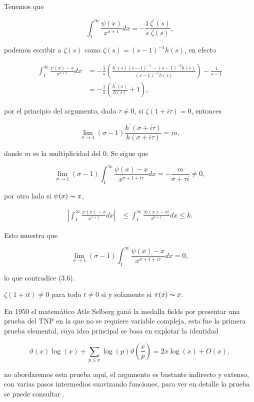 Tenemos que

$$\int_1^{\infty}\frac{\psi(x)}{x^{s+1}}dx=-\frac{1}{s}\frac{\zeta^{\prime}(s)}{\zeta(s)},$$

podemos escribir a $\zeta(s)$ como $\zeta(s)=(s-1)^{-1}h(s)$, en efecto

\begin{align*}
    \int_1^{\infty}\frac{\psi(x)-x}{x^{s+1}}dx&=-\frac{1}{s}\left(\frac{h^{\prime}(s)(s-1)^{-1}-(s-1)^{-2}h(s)}{(s-1)^{-1}h(s)}\right)-\frac{1}{s-1}\\
    &=-\frac{1}{s}\left(\frac{h^{\prime}(s)}{h(s)}+1\right)
,\end{align*}

por el principio del argumento, dado $\tau\neq 0$, si $\zeta(1+i\tau)=0$, entonces

$$\lim_{\sigma \to 1}(\sigma-1)\frac{h^{\prime}(\sigma+i\tau)}{h(\sigma+i\tau)}=m,$$

donde $m$ es la multiplicidad del 0. Se sigue que


\begin{equation}
    \lim_{\sigma \to 1}(\sigma-1)\int_1^{\infty}\frac{\psi(x)-x}{x^{\sigma+1+i\tau}}dx=-\frac{m}{\sigma+\tau i}\neq 0,
\end{equation}

por otro lado si $\psi(x)\thicksim x$, 

\begin{align*}
    \left|\int_1^{\infty}\frac{\psi(x)-x}{x^{s+1}}dx\right|&\leq \int_1^{\infty}\frac{|\psi(x)-x|}{x^{\sigma+1}}dx\leq k
.\end{align*}

Esto muestra que 

$$\lim_{\sigma \to 1} (\sigma-1)\int_1^{\infty}\frac{\psi(x)-x}{x^{\sigma+1+i\tau}}dx=0,$$

lo que contradice (3.6).

\begin{corollary}
    $\zeta(1+it)\neq 0$ para todo $t\neq 0$ si y solamente si $\pi(x)\thicksim x$.
\end{corollary}

En 1950 el matemático Atle Selberg ganó la medalla fields por presentar una prueba del TNP en la que no se requiere variable compleja, esta fue la primera prueba elemental, cuya idea principal se basa en explotar la identidad 

$$\vartheta(x) \log (x)+\sum_{p \leq x} \log (p) \vartheta\left(\frac{x}{p}\right)=2 x \log (x)+O(x),$$

no abordaremos esta prueba aquí, el argumento es bastante indirecto y extenso, con varias pasos intermedios suavizando funciones, para ver en detalle la prueba se puede consultar \cite{jameson2003prime}.\\

